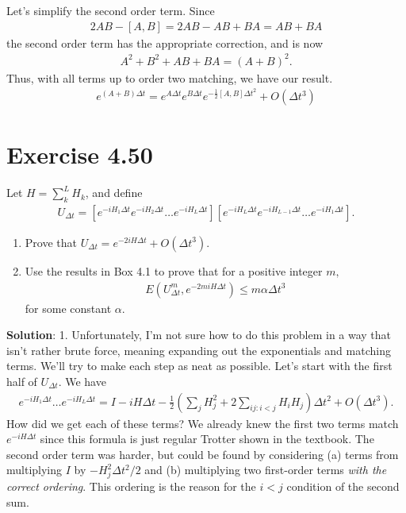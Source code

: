 \documentclass{book}
\begin{document}
    Let's simplify the second order term. Since
    \begin{align}
        2AB - [A,B] = 2AB - AB + BA = AB + BA
    \end{align}
    the second order term has the appropriate correction, and is now
    \begin{align}
        A^2 + B^2 + AB + BA = (A+B)^2.
    \end{align}
    Thus, with all terms up to order two matching, we have our result.
    \begin{align}
        e^{(A+B)\Delta t} = e^{A\Delta t}e^{B\Delta t}e^{-\frac{1}{2}[A,B]\Delta t^2} + O(\Delta t^3)
    \end{align}

\section*{Exercise 4.50}
    Let $H = \sum_k^L H_k$, and define
    \begin{align} \label{eq:4.50_2ndOrderTrot}
        U_{\Delta t} = \left[e^{-iH_1 \Delta t}e^{-iH_2 \Delta t}\dots e^{-iH_L \Delta t}\right]\left[e^{-iH_L \Delta t} e^{-iH_{L-1} \Delta t} \dots e^{-iH_1 \Delta t}\right].
    \end{align}
    \begin{enumerate}
        \item Prove that $U_{\Delta t} = e^{-2iH\Delta t} + O(\Delta t^3)$.
        \item Use the results in Box 4.1 to prove that for a positive integer $m,$
        \begin{align}
            E(U_{\Delta t}^m, e^{-2miH\Delta t}) \leq m \alpha \Delta t^3
        \end{align}
        for some constant $\alpha$.
    \end{enumerate}

    \textbf{Solution}: 1. Unfortunately, I'm not sure how to do this problem in a way that isn't rather brute force, meaning expanding out the exponentials and matching terms. We'll try to make each step as neat as possible. Let's start with the first half of $U_{\Delta t}$. We have
    \begin{align} \label{eq:4.50_leftexpand}
        e^{-i H_1 \Delta t}\dots e^{-i H_L \Delta t} = I - i H \Delta t - \frac{1}{2}\left(\sum_j H_j^2 + 2 \sum_{ij: i < j} H_i H_j\right)\Delta t^2 + O(\Delta t^3).
    \end{align}
    How did we get each of these terms? We already knew the first two terms match $e^{-i H \Delta t}$ since this formula is just regular Trotter shown in the textbook. The second order term was harder, but could be found by considering (a) terms from multiplying $I$ by $-H_j^2 \Delta t^2 /2$ and (b) multiplying two first-order terms \emph{with the correct ordering}. This ordering is the reason for the $i< j$ condition of the second sum.
\end{document}
